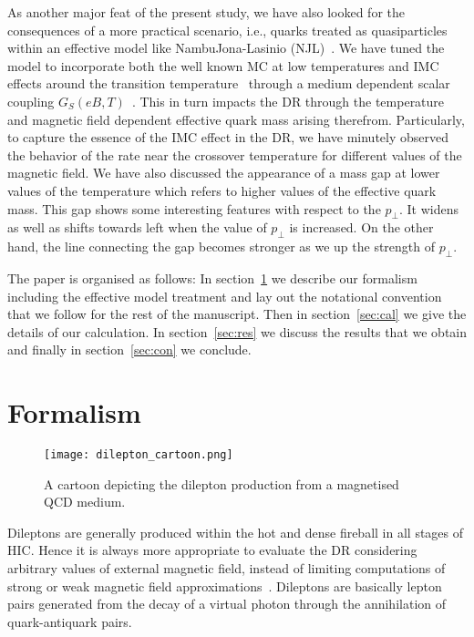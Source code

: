 \documentclass[aps,prd,floatfix,showpacs,showkeys,superscriptadress,unsortedaddress,nofootinbib,onecolumn]{revtex4-1}
\newcommand{\sperp}{\scriptscriptstyle{\perp}}
\begin{document}
As another major feat of the present study, we have also looked for the consequences of a more practical scenario, i.e., quarks treated as quasiparticles within an effective model like Nambu\textemdash Jona-Lasinio (NJL)~\cite{Farias:2014eca,Farias:2016gmy}. We have tuned the model to incorporate both the well known MC at low temperatures and IMC effects around the transition temperature~\cite{Bali:2012zg,Bali:2011qj} through a medium dependent scalar coupling $G_S(eB,T)$~\cite{Farias:2016gmy}. This in turn impacts the DR through the temperature and magnetic field dependent effective quark mass arising therefrom. Particularly, to capture the essence of the IMC effect in the DR, we have minutely observed the behavior of the rate near the crossover temperature for different values of the magnetic field. We have also discussed the appearance of a mass gap at lower values of the temperature which refers to higher values of the effective quark mass. This gap shows some interesting features with respect to the $p_{\sperp}$. It widens as well as shifts towards left when the value of $p_{\sperp}$ is increased. On the other hand, the line connecting the gap becomes stronger as we up the strength of $p_{\sperp}$.

The paper is organised as follows: In section~\ref{sec:form} we describe our formalism including the effective model treatment and lay out the notational convention that we follow for the rest of the manuscript. Then in section~\ref{sec:cal} we give the details of our calculation. In section~\ref{sec:res} we discuss the results that we obtain and finally in section~\ref{sec:con} we conclude. 



\section{Formalism}
\label{sec:form}
\begin{figure}
\hspace{1cm}
\texttt{[image: dilepton\_cartoon.png]}
\caption{A cartoon depicting the dilepton production from a magnetised QCD medium.}
\label{fig:dilepton_cartoon}
\end{figure}
Dileptons are generally produced within the hot and dense fireball in all stages of HIC. Hence it is always more appropriate to evaluate the DR considering arbitrary values of external magnetic field, instead of limiting computations of strong or weak magnetic field approximations~\cite{Bandyopadhyay:2016fyd,Bandyopadhyay:2017raf}. Dileptons are basically lepton pairs generated from the decay of a virtual photon through the annihilation of quark-antiquark pairs.
\end{document}
